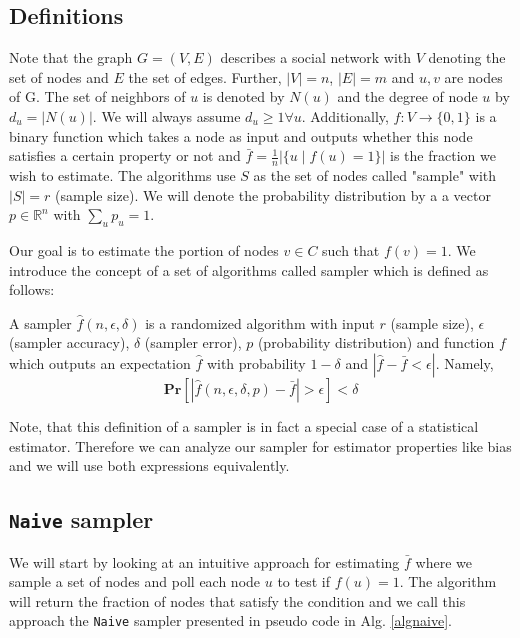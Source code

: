 \label{algorithms}
\subsection{Definitions}
Note that the graph $G = (V,E)$ describes a social network with $V$ denoting the set of nodes and $E$ the set of edges. Further, $|V| = n$, $|E| = m$ and $u,v$ are nodes of G. The set of neighbors of $u$ is denoted by $N(u)$ and the degree of node $u$ by $d_u=|N(u)|$. We will always assume $d_u \geq 1  \forall u$. Additionally, $f : V \rightarrow \{0,1\}$ is a binary function which takes a node as input and outputs whether this node satisfies a certain property or not and $\bar{f} = \frac{1}{n}|\{u\;|\;f(u) = 1\}|$ is the fraction we wish to estimate.
The algorithms use $S$ as the set of nodes called "sample" with $|S| = r$ (sample size).
We will denote the probability distribution by a a vector $p \in \mathbb{R}^n$ with $\sum_up_u = 1$.

Our goal is to estimate the portion of nodes $v \in C$ such that $f(v) = 1$.
We introduce the concept of a set of algorithms called sampler which is defined as follows:
\begin{definition}[sampler]
  A sampler $\hat{f}(n,\epsilon,\delta)$ is a randomized algorithm with input $r$ (sample size), $\epsilon$ (sampler accuracy), $\delta$ (sampler error), $p$ (probability distribution) and function $f$ which outputs an expectation $\hat{f}$ with probability $1-\delta$ and $|\hat{f}-\bar{f}<\epsilon|$. Namely,
  $$\textbf{Pr}[|\hat{f}(n,\epsilon,\delta,p)-\bar{f} | > \epsilon] < \delta$$
  \label{defsampler}
\end{definition}

Note, that this definition of a sampler is in fact a special case of a statistical estimator.
Therefore we can analyze our sampler for estimator properties like bias and we will use both expressions equivalently.
\subsection{\texttt{Naive} sampler}
We will start by looking at an intuitive approach \cite{goldreich1997sample} for estimating $\bar{f}$ where we sample a set of nodes and poll each node $u$ to test if $f(u)=1$.
The algorithm will return the fraction of nodes that satisfy the condition and we call this approach the \texttt{Naive} sampler presented in pseudo code in Alg. \ref{algnaive}.

